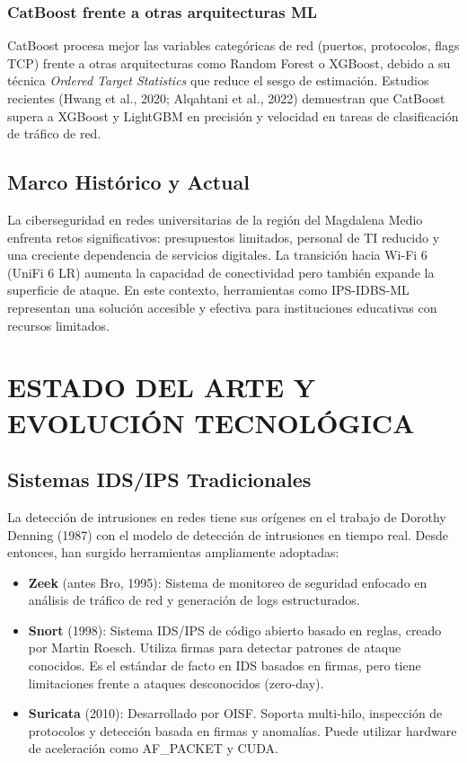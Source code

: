 \documentclass[12pt,letterpaper]{report}
\begin{document}
\subsection{CatBoost frente a otras arquitecturas ML}

CatBoost procesa mejor las variables categóricas de red (puertos, protocolos, flags TCP) frente a otras arquitecturas como Random Forest o XGBoost, debido a su técnica \textit{Ordered Target Statistics} que reduce el sesgo de estimación. Estudios recientes (Hwang et al., 2020; Alqahtani et al., 2022) demuestran que CatBoost supera a XGBoost y LightGBM en precisión y velocidad en tareas de clasificación de tráfico de red.

\section{Marco Histórico y Actual}

La ciberseguridad en redes universitarias de la región del Magdalena Medio enfrenta retos significativos: presupuestos limitados, personal de TI reducido y una creciente dependencia de servicios digitales. La transición hacia Wi-Fi 6 (UniFi 6 LR) aumenta la capacidad de conectividad pero también expande la superficie de ataque. En este contexto, herramientas como IPS-IDBS-ML representan una solución accesible y efectiva para instituciones educativas con recursos limitados.

\chapter{ESTADO DEL ARTE Y EVOLUCIÓN TECNOLÓGICA}

\section{Sistemas IDS/IPS Tradicionales}

La detección de intrusiones en redes tiene sus orígenes en el trabajo de Dorothy Denning (1987) con el modelo de detección de intrusiones en tiempo real. Desde entonces, han surgido herramientas ampliamente adoptadas:

\begin{itemize}
  \item \textbf{Zeek} (antes Bro, 1995): Sistema de monitoreo de seguridad enfocado en análisis de tráfico de red y generación de logs estructurados.
  
  \item \textbf{Snort} (1998): Sistema IDS/IPS de código abierto basado en reglas, creado por Martin Roesch. Utiliza firmas para detectar patrones de ataque conocidos. Es el estándar de facto en IDS basados en firmas, pero tiene limitaciones frente a ataques desconocidos (zero-day).
  
  \item \textbf{Suricata} (2010): Desarrollado por OISF. Soporta multi-hilo, inspección de protocolos y detección basada en firmas y anomalías. Puede utilizar hardware de aceleración como AF\_PACKET y CUDA.
\end{itemize}
\end{document}
